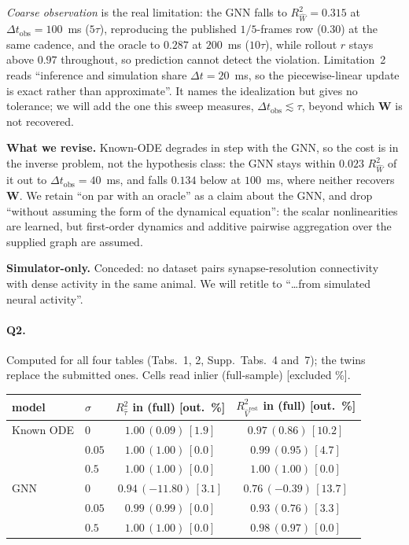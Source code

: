 \documentclass[11pt]{article}
\newcommand{\Rw}{R^2_{\widehat W}}
\newcommand{\Rt}{R^2_{\hat\tau}}
\newcommand{\Rv}{R^2_{\hat V^{\mathrm{rest}}}}
\newcommand{\Mat}[1]{\mathbf{#1}}
\begin{document}
\emph{Coarse observation} is the real limitation: the GNN falls to $\Rw = 0.315$
at $\Delta t_{\mathrm{obs}} = 100$~ms ($5\tau$), reproducing the published
$1/5$-frames row ($0.30$) at the same cadence, and the oracle to $0.287$ at
$200$~ms ($10\tau$), while rollout $r$ stays above $0.97$ throughout, so
prediction cannot detect the violation. Limitation~2 reads ``inference and simulation share $\Delta t =
20$~ms, so the piecewise-linear update is exact rather than approximate''. It
names the idealization but gives no tolerance; we will add the one this sweep
measures, $\Delta t_{\mathrm{obs}} \lesssim \tau$, beyond which $\Mat{W}$ is not
recovered.

\textbf{What we revise.} Known-ODE degrades in step with the GNN, so the cost is in the inverse problem,
not the hypothesis class: the GNN stays within $0.023$ $\Rw$ of it out to
$\Delta t_{\mathrm{obs}} = 40$~ms, and falls $0.134$ below at $100$~ms, where
neither recovers $\Mat{W}$. We retain
``on par with an oracle'' as a claim about the GNN, and drop ``without assuming
the form of the dynamical equation'': the scalar nonlinearities are learned, but
first-order dynamics and additive pairwise aggregation over the supplied graph
are assumed.

\textbf{Simulator-only.} Conceded: no dataset pairs synapse-resolution
connectivity with dense activity in the same animal. We will retitle to
``\dots from simulated neural activity''.

\paragraph{Q2.}
Computed for all four tables (Tabs.~1, 2, Supp.~Tabs.~4 and~7); the twins replace
the submitted ones. Cells read inlier (full-sample) [excluded \%].

\begin{center}
{\footnotesize
\begin{tabular}{llcc}
\toprule
model & $\sigma$ & $\Rt$ in (full) [out.\ \%] & $\Rv$ in (full) [out.\ \%] \\
\midrule
Known ODE & $0$    & $1.00\,(0.09)\,[1.9]$   & $0.97\,(0.86)\,[10.2]$ \\
          & $0.05$ & $1.00\,(1.00)\,[0.0]$   & $0.99\,(0.95)\,[4.7]$ \\
          & $0.5$  & $1.00\,(1.00)\,[0.0]$   & $1.00\,(1.00)\,[0.0]$ \\
\midrule
GNN       & $0$    & $0.94\,(-11.80)\,[3.1]$ & $0.76\,(-0.39)\,[13.7]$ \\
          & $0.05$ & $0.99\,(0.99)\,[0.0]$   & $0.93\,(0.76)\,[3.3]$ \\
          & $0.5$  & $1.00\,(1.00)\,[0.0]$   & $0.98\,(0.97)\,[0.0]$ \\
\bottomrule
\end{tabular}}
\end{center}
\end{document}
